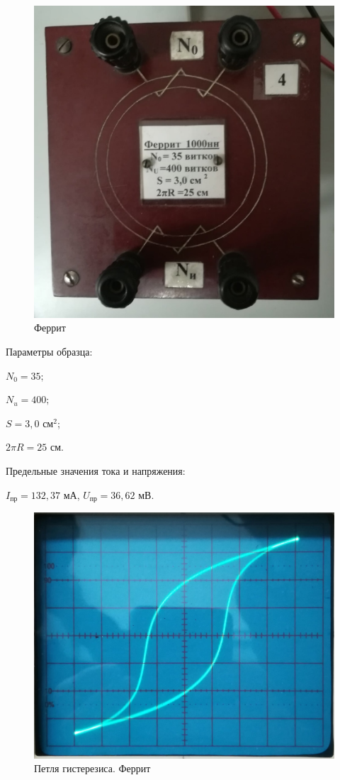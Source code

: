 \documentclass[a4paper,12pt]{article} %
\begin{document}
\begin{figure}[h!]
	\centering
	\includegraphics[scale=0.44]{Pictures/ФЕРРИТ.jpg}
	\caption{Феррит}
\end{figure}

Параметры образца:

$N_0 = 35;$

$N_u = 400;$

$S = 3,0$ см$^2$;

$2\pi R = 25$ см.

\vspace{7mm}
Предельные значения тока и напряжения:

$I_{\text{пр}} = 132,37$ мА, $U_{\text{пр}} = 36,62$ мВ.

\begin{figure}[h!]
	\centering
	\includegraphics[scale=0.27]{Pictures/ФЕРРИТ_ПЕТЛЯ.jpg}
	\caption{Петля гистерезиса. Феррит}
\end{figure}
\end{document}

